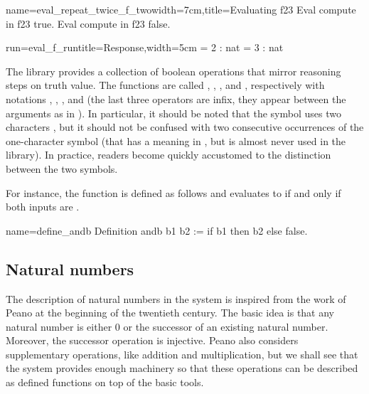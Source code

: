 \begin{coq}{name=eval_repeat_twice_f_two}{width=7cm,title=Evaluating f23}
Eval compute in f23 true.
Eval compute in f23 false.
\end{coq}
\begin{coqout}{run=eval_f_run}{title=Response,width=5cm}
  = 2 : nat
  = 3 : nat
\end{coqout}

The \mcbMC{} library provides a collection of boolean operations that
mirror reasoning steps on truth value.  The functions are called
, ,  , and , respectively with notations
\C{\~\~},  \C{||}, \C{&&}, and \C{==>} (the last three operators are
infix, they appear between the arguments as in ).
  In
particular, it should be
noted that the symbol \C{\~\~} uses two characters \C{\~}, but it should
not be confused with two consecutive occurrences of the one-character symbol
\C{\~} (that has a meaning in \Coq{}, but is almost never used
in the \mcbMC{} library).  In practice, readers become quickly accustomed to the
distinction between the two symbols.

For instance, the function  is defined as follows and
evaluates to  if and only if both inputs are .

\begin{coq}{name=define_andb}{}
Definition andb b1 b2 := if b1 then b2 else false.
\end{coq}


\subsection{Natural numbers}
The description of natural numbers in the \Coq{} system is inspired from
the work of Peano at the beginning of the twentieth century.  The
basic idea is that any natural number is either 0 or the successor of
an existing natural number.  Moreover, the successor operation is
injective.  Peano also considers supplementary operations, like
addition and multiplication, but we shall see that the \Coq{} system
provides enough machinery so that these operations can be described as
defined functions on top of the basic tools.

